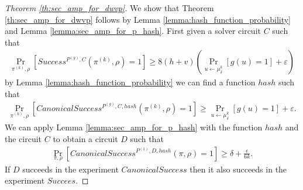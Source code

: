\begin{proof}[Theorem \ref{th:sec_amp_for_dwvp}]
We show that Theorem \ref{th:sec_amp_for_dwvp} follows by Lemma \ref{lemma:hash_function_probability} and Lemma \ref{lemma:sec_amp_for_p_hash}.
First given a solver circuit $C$ such that
\begin{align*}
    \underset{\pi^{(k)}, \rho}{\Pr}\left[Success^{P^{(g)}, C}(\pi^{(k)}, \rho) = 1\right] \geq 8(h+v)\left(\underset{u \leftarrow \mu_\delta^k}{\Pr}\left[g(u) = 1\right] + \varepsilon\right)
\end{align*}
by Lemma \ref{lemma:hash_function_probability} we can find a function $hash$ such that
\begin{align*}
    \underset{\pi^{(k)}, \rho}{\Pr}\left[CanonicalSuccess^{P^{(g)}, C, hash}(\pi^{(k)}, \rho) = 1\right] \geq \underset{u \leftarrow \mu_\delta^k}{\Pr}\left[g(u) = 1\right] + \varepsilon.
\end{align*}
We can apply Lemma \ref{lemma:sec_amp_for_p_hash} with the function $hash$ and the circuit $C$ to obtain a circuit $D$ such that
\begin{align*}
    \underset{\pi, \rho}{\Pr}\left[CanonicalSuccess^{P^{(1)}, D, hash}(\pi, \rho) = 1\right] \geq \delta + \frac{\epsilon}{6k}.
\end{align*}
If $D$ succeeds in the experiment $CanonicalSuccess$ then it also succeeds in the experiment $Succees$.
\end{proof}
